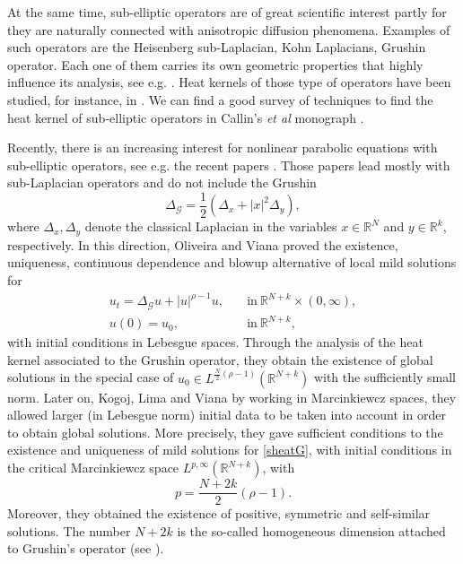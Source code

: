 \documentclass[a4,psfig,english,12pt,epsf,portrait]{article}
\numberwithin{equation}{section}
\def\R{{\mathbb {R}}}
\def\R{\mathbb{R}}
\begin{document}
At the same time, sub-elliptic operators are of great scientific interest partly for they are naturally connected with anisotropic diffusion phenomena. Examples of such operators are the Heisenberg sub-Laplacian, Kohn Laplacians, Grushin operator. Each one of them carries its own geometric properties that highly influence its analysis, see e.g. \cite{Alves-G-Lo-24,Calin-11, Chang-Li-12,Gaveau-77,Goldstein-Kogoj, Kogoj-Lan-12,Wu-15}. Heat kernels of those type of operators have been studied, for instance, in \cite{ Ba-Furutani-15, Arous-89, Chang-Li-15, Gaveau-77}. We can find a good survey of techniques to find the heat kernel of sub-elliptic operators in Callin's \textit{et al} monograph \cite{Calin-11}. 

Recently, there is an increasing interest for nonlinear parabolic equations with sub-elliptic operators, see e.g. the recent papers \cite{Fino-Ruz-Tor-24, Hi-Oka-24,J-Ki-S-16,RuzY-22}. Those papers lead mostly with sub-Laplacian operators and do not include the Grushin
\begin{equation*}\label{Grushiop}
	\Delta_{\mathcal{G}}=\dfrac{1}{2}\left(\Delta_{x}+|x|^2\Delta_{y}\right), 
\end{equation*}
where $\Delta_x, \Delta_y$ denote the classical Laplacian in the variables $x\in\R^N$ and $y\in\R^k$, respectively. In this direction, Oliveira and Viana \cite{Oli-Vi-23} proved the existence, uniqueness, continuous dependence and blowup alternative of local mild solutions for 
\begin{equation}\label{sheatG}
	\begin{array}{ll}
		u_t = \Delta_\mathcal{G} u + |u|^{\rho-1}u,&\quad \mbox{in}\  \R^{N+k}\times (0,\infty) ,\\ 
		u(0)=u_0,&\quad \mbox{in}\ \R^{N+k},
	\end{array}
\end{equation} 
with initial conditions in Lebesgue spaces. Through the analysis of the heat kernel associated to the Grushin operator, they obtain the existence of global solutions in the special case of $u_0\in L^{\frac{ N}{2}(\rho-1)}(\R^{N+k})$ with the sufficiently small norm. Later on, Kogoj, Lima and Viana \cite{Kogoj-Lima-Viana-24} by working in Marcinkiewcz spaces, they allowed larger (in Lebesgue norm) initial data to be taken into account in order to obtain global solutions. More precisely, they gave sufficient conditions to the existence and uniqueness of mild solutions for \eqref{sheatG}, with initial conditions in the critical Marcinkiewcz space $L^{p,\infty}(\R^{N+k})$, with 
\begin{equation}\label{p}
	p = \frac{N+2k}{2}(\rho-1) .
\end{equation}
Moreover, they obtained the existence of positive, symmetric and self-similar solutions. The number $N+2k$ is the so-called homogeneous dimension attached to Grushin's operator (see \cite{Kogoj-Lan-18}). 
\end{document}
